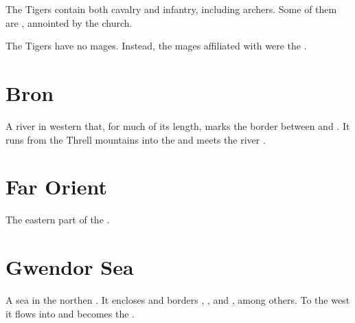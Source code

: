 The Tigers contain both cavalry and infantry, including archers. 
Some of them are , annointed by the  church. 

The Tigers have no mages. 
Instead, the mages affiliated with  were the . 















\section{Bron}
A river in western  that, for much of its length, marks the border between  and . It runs from the Threll mountains into the  and meets the river . 















\section{Far Orient}
The eastern part of the . 















\section{Gwendor Sea}
A sea in the northen . It encloses  and borders , ,  and , among others. To the west it flows into and becomes the . 















